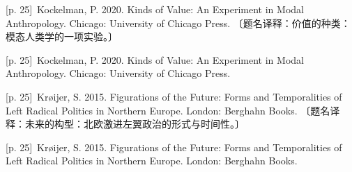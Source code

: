 \documentclass[10pt,a4paper]{article}
\begin{document}
\noindent\begin{minipage}{\textwidth}\begin{minipage}[t]{\dimexpr.5\textwidth-4mm\relax}\noindent\begin{minipage}[t]{\linewidth}{\scriptsize\color{gray} [p. 25]}\ Kockelman, P. 2020. Kinds of Value: An Experiment in Modal Anthropology. Chicago: University of Chicago Press. 〔题名译释：价值的种类：模态人类学的一项实验。〕\par\end{minipage}\par\end{minipage}\hfill\begin{minipage}[t]{\dimexpr.5\textwidth-4mm\relax}\noindent\begin{minipage}[t]{\linewidth}{\scriptsize\color{gray} [p. 25]}\ Kockelman, P. 2020. Kinds of Value: An Experiment in Modal Anthropology. Chicago: University of Chicago Press.\par\end{minipage}\par\end{minipage}\end{minipage}\par
\noindent\begin{minipage}{\textwidth}\begin{minipage}[t]{\dimexpr.5\textwidth-4mm\relax}\noindent\begin{minipage}[t]{\linewidth}{\scriptsize\color{gray} [p. 25]}\ Krøijer, S. 2015. Figurations of the Future: Forms and Temporalities of Left Radical Politics in Northern Europe. London: Berghahn Books. 〔题名译释：未来的构型：北欧激进左翼政治的形式与时间性。〕\par\end{minipage}\par\end{minipage}\hfill\begin{minipage}[t]{\dimexpr.5\textwidth-4mm\relax}\noindent\begin{minipage}[t]{\linewidth}{\scriptsize\color{gray} [p. 25]}\ Krøijer, S. 2015. Figurations of the Future: Forms and Temporalities of Left Radical Politics in Northern Europe. London: Berghahn Books.\par\end{minipage}\par\end{minipage}\end{minipage}\par
\end{document}
